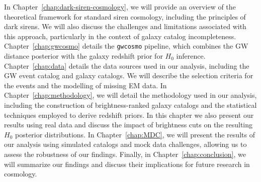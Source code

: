 In Chapter~\ref{chap:dark-siren-cosmology}, we will provide an overview of the theoretical framework for standard siren cosmology, including the principles of dark sirens. We will also discuss the challenges and limitations associated with this approach, particularly in the context of galaxy catalog incompleteness. Chapter~\ref{chap:gwcosmo} details the \texttt{gwcosmo} pipeline, which combines the \ac{GW} distance posterior with the galaxy redshift prior for $H_0$ inference. Chapter~\ref{chap:data} details the data sources used in our analysis, including the \ac{GW} event catalog and galaxy catalogs. We will describe the selection criteria for the events and the modelling of missing \ac{EM} data. In Chapter~\ref{chap:methodology}, we will detail the methodology used in our analysis, including the construction of brightness-ranked galaxy catalogs and the statistical techniques employed to derive redshift priors. In this chapter we also present our results using real data and discuss the impact of brightness cuts on the resulting $H_0$ posterior distributions. In Chapter~\ref{chap:MDC}, we will present the results of our analysis using simulated catalogs and mock data challenges, allowing us to assess the robustness of our findings. Finally, in Chapter~\ref{chap:conclusion}, we will summarize our findings and discuss their implications for future research in cosmology.
